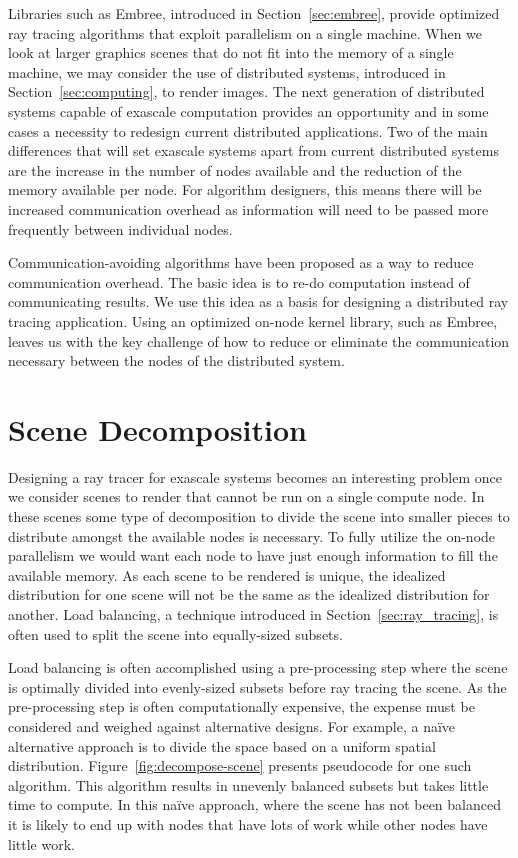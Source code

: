 \label{chpt:design}

Libraries such as Embree, introduced in Section~\ref{sec:embree}, provide 
optimized ray tracing algorithms that exploit parallelism on a single machine.  
When we look at larger graphics scenes that do not fit into the memory of a 
single machine, we may consider the use of distributed systems, introduced in
Section~\ref{sec:computing}, to render images.  The next generation of 
distributed systems capable of exascale computation provides an opportunity and 
in some cases a necessity to redesign current distributed applications.  Two of 
the main differences that will set exascale systems apart from current 
distributed systems are the increase in the number of nodes available and the 
reduction of the memory available per node.  For algorithm designers, this means 
there will be increased communication overhead as information will need to be
passed more frequently between individual nodes.

Communication-avoiding algorithms have been proposed as a way to reduce 
communication overhead.  The basic idea is to re-do computation instead of 
communicating results.  We use this idea as a basis for designing a distributed 
ray tracing application.  Using an optimized on-node kernel library, such as
Embree, leaves us with the key challenge of how to reduce or eliminate the
communication necessary between the nodes of the distributed system.

\section{Scene Decomposition}
\label{sec:scene_decomposition}
Designing a ray tracer for exascale systems becomes an interesting problem once
we consider scenes to render that cannot be run on a single compute node.   In
these scenes some type of decomposition to divide the scene into smaller
pieces to distribute amongst the available nodes is necessary.  To fully utilize
the on-node parallelism we would want each node to have just enough information
to fill the available memory. As each scene to be rendered is unique, the
idealized distribution for one scene will not be the same as the idealized
distribution for another.  Load balancing, a technique introduced in
Section~\ref{sec:ray_tracing}, is often used to split the scene into
equally-sized subsets.

Load balancing is often accomplished using a pre-processing step where the scene 
is optimally divided into evenly-sized subsets before ray tracing the 
scene.  As the pre-processing step is often computationally expensive, the 
expense must be considered and weighed against alternative designs. For example, 
a na\"{i}ve alternative approach is to divide the space based on a uniform 
spatial distribution.  Figure~\ref{fig:decompose-scene} presents pseudocode
for one such algorithm.  This algorithm results in unevenly balanced subsets but
takes little time to compute.  In this na\"{i}ve approach, where the scene has
not been balanced it is likely to end up with nodes that have lots of work
while other nodes have little work.

